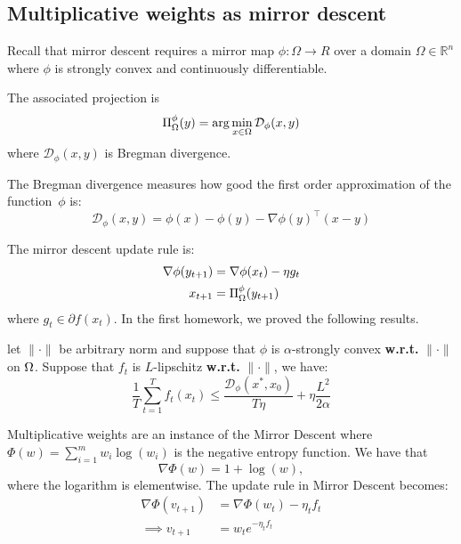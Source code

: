 \subsection{Multiplicative weights as mirror descent}

Recall that mirror descent requires a mirror map $\phi : \Omega \to R$ over a
domain $\Omega \in \mathbb{R}^n$ where $\phi$ is strongly convex and
continuously differentiable.

The associated projection is
\begin{equation*}
    \Pi^\phi_\Omega (y) = \arg\min_{x\in\Omega} \mathcal{D}_\phi(x,y)
\end{equation*}
where $\mathcal{D}_\phi(x,y)$ is Bregman divergence.
\begin{definition}
The Bregman divergence measures how good the first order approximation of the
function~$\phi$ is:
    \begin{equation*}
        \mathcal{D}_\phi(x,y) = \phi(x) - \phi(y) - \nabla \phi(y) ^\intercal (x-y)
    \end{equation*}
\end{definition}
The mirror descent update rule is:
\begin{align*}
    \nabla \phi(y_{t+1}) &= \nabla \phi (x_t) - \eta g_t \\
    x_{t+1} &=  \Pi^\phi_\Omega (y_{t+1})
\end{align*}
where $g_t \in \partial f(x_t).$ 
In the first homework, we proved the following results.
\begin{theorem}
    let $\|\cdot\|$ be arbitrary norm and suppose that $\phi$ is $\alpha$-strongly convex      \textbf{w.r.t.} $\|\cdot\|$ on $\Omega$. Suppose that $f_t$ is $L$-lipschitz \textbf{w.r.t.} $\|\cdot\|$, we have:
    \begin{equation*}
        \frac{1}{T}\sum^T_{t=1} f_t(x_t) \leq \frac{ \mathcal{D}_\phi(x^*,x_0)}{T \eta}+ \eta \frac{L^2}{2\alpha}
    \end{equation*}
\end{theorem}


Multiplicative weights are an instance of the Mirror Descent where $\Phi(w)=
\sum_{i=1}^m w_i \log(w_i)$ is the negative entropy function.
We have that
\[
\nabla\Phi(w) =  1 + \log(w),
\]
where the logarithm is elementwise.
The update rule in Mirror Descent becomes:
\begin{align*}
    \nabla\Phi(v_{t+1}) &=\nabla\Phi(w_{t}) - \eta_tf_t \\
    \implies v_{t+1} &= w_te^{-\eta_t f_t}
\end{align*}


